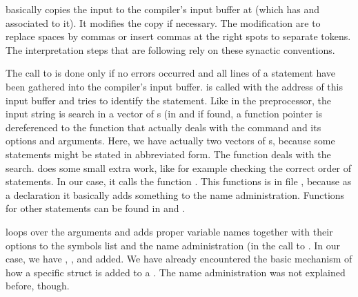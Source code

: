  basically copies the input to the compiler's input buffer at
 (which has  and  associated to it). It
modifies the copy if necessary. The modification are to replace spaces by commas
or insert commas at the right spots to separate tokens. The interpretation steps
that are following rely on these synactic conventions.

The call to  is done only if no errors occurred and all
lines of a statement have been gathered into the compiler's input buffer.
 is called with the address of this input buffer and tries
to identify the statement. Like in the preprocessor, the input string is search
in a vector of s (in  and if found, a function pointer
is dereferenced to the function that actually deals with the command and its
options and arguments.  Here, we have actually two vectors of s,
because some statements might be stated in abbreviated form. The function
 deals with the search.  does some small
extra work, like for example checking the correct order of statements. In our
case, it calls the function . This functions is in file
, because as a declaration it basically adds something to the name
administration. Functions for other statements can be found in 
and .

 loops over the arguments and adds proper variable names together
with their options to the symbols list  and the name
administration (in the call to .  In our case, we have ,
, and  added. We have already encountered the basic mechanism of how a
specific struct is added to a . The name administration was not
explained before, though.

